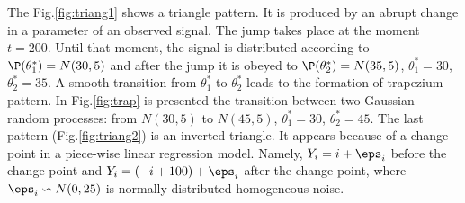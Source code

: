 The Fig.\ref{fig:triang1} shows a triangle pattern. It is produced by an abrupt change in a parameter of an observed signal. The jump takes place at the moment $t = 200$. Until that moment, the signal is distributed according to $\P(\theta^*_1) = N(30, 5)$ and after the jump it is obeyed to $\P(\theta^*_2) = N(35, 5)$, $\theta_1^* = 30$, $\theta_2^* = 35$.
A smooth transition from $\theta_1^*$ to $\theta_2^*$ leads to the formation of trapezium pattern. In Fig.\ref{fig:trap} is presented the transition between two Gaussian random processes: from $N(30, 5)$ to $N(45, 5)$, $\theta_1^* = 30$, $\theta_2^* = 45$.
The last pattern (Fig.\ref{fig:triang2}) is an inverted triangle. It appears because of a change point in a piece-wise linear regression model. Namely, $Y_i = i + \eps_i$ before the change point and  $Y_i = (-i + 100) + \eps_i$ after the change point, where $\eps_i \backsim N(0, 25)$ is normally distributed homogeneous noise. \\

